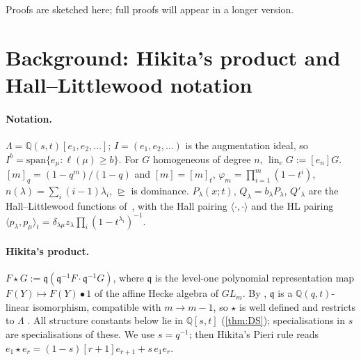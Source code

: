 \documentclass[submission]{FPSAC2027}
\theoremstyle{definition}
\theoremstyle{remark}
\newcommand{\lin}{\operatorname{lin}_e}
\newcommand{\Lam}{\Lambda}
\begin{document}
Proofs are sketched here; full proofs will appear in a longer version.

\section{Background: Hikita's product and Hall--Littlewood notation}\label{sec:bg}

\paragraph{Notation.} $\Lam=\mathbb{Q}(s,t)[e_1,e_2,\dots]$; $I=(e_1,e_2,\dots)$ is the augmentation ideal, so $I^b=\mathrm{span}\{e_\mu:\ell(\mu)\ge b\}$. For $G$ homogeneous of degree $n$, $\lin G:=[e_n]G$. $[m]_q=(1-q^m)/(1-q)$ and $[m]=[m]_t$, $\varphi_m=\prod_{i=1}^m(1-t^i)$, $n(\lambda)=\sum_i(i-1)\lambda_i$, $\trianglerighteq$ is dominance. $P_\lambda(x;t)$, $Q_\lambda=b_\lambda P_\lambda$, $Q'_\lambda$ are the Hall--Littlewood functions of~\cite[Ch.~III]{Macdonald95}, with the Hall pairing $\langle\cdot,\cdot\rangle$ and the HL pairing $\langle p_\lambda,p_\mu\rangle_t=\delta_{\lambda\mu}z_\lambda\prod_i(1-t^{\lambda_i})^{-1}$.

\paragraph{Hikita's product.} $F\star G:=\mathfrak{q}(\mathfrak{q}^{-1}F\cdot\mathfrak{q}^{-1}G)$, where $\mathfrak q$ is the level-one polynomial representation map $F(Y)\mapsto F(Y)\bullet 1$ of the affine Hecke algebra of $GL_m$. By \cite[Lemma~3.1, Cor.~3.9]{Hikita25}, $\mathfrak q$ is a $\mathbb{Q}(q,t)$-linear isomorphism, compatible with $m\to m-1$, so $\star$ is well defined and restricts to $\Lam$ \cite[Def.~3.4, Lemma~3.2, Cor.~3.10]{Hikita25}. All structure constants below lie in $\mathbb{Q}[s,t]$ (\cref{thm:DS}); specialisations in $s$ are specialisations of these. We use $s=q^{-1}$; then Hikita's Pieri rule \cite[Thm.~3.12]{Hikita25} reads $e_1\star e_r=(1-s)[r+1]e_{r+1}+s\,e_1e_r$.
\end{document}

